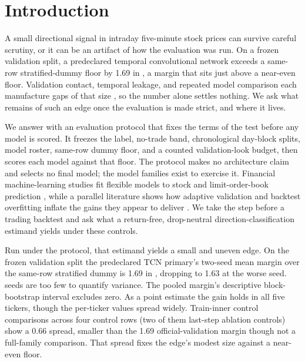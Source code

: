 \section{Introduction}

A small directional signal in intraday five-minute stock prices can survive careful
scrutiny, or it can be an artifact of how the evaluation was run. On a frozen
validation split, a predeclared temporal convolutional network exceeds a same-row
stratified-dummy floor by 1.69\pp{} in \macrofone{}, a margin that sits just above a
near-even floor. Validation contact, temporal leakage, and repeated model comparison
each manufacture gaps of that size
\cite{kapoor2023leakage,bailey2016probability,harvey2016cross}, so the number alone
settles nothing. We ask what remains of such an edge once the evaluation is made
strict, and where it lives.

We answer with an evaluation protocol that fixes the terms of the test before any
model is scored. It freezes the label, no-trade band, chronological day-block splits,
model roster, same-row dummy floor, and a counted validation-look budget, then scores
each model against that floor. The protocol makes no architecture claim and selects no
final model; the model families exist to exercise it. Financial machine-learning
studies fit flexible models to stock and limit-order-book prediction
\cite{gu2020empirical,zhang2019deeplob}, while a parallel literature shows how adaptive
validation and backtest overfitting inflate the gains they appear to deliver
\cite{kapoor2023leakage,bailey2016probability,harvey2016cross}. We take the step before
a trading backtest and ask what a return-free, drop-neutral direction-classification
estimand yields under these controls.

Run under the protocol, that estimand yields a small and uneven edge. On the frozen
validation split the predeclared TCN primary's two-seed mean margin over the same-row
stratified dummy is 1.69\pp{} in \macrofone{}, dropping to 1.63\pp{} at the worse seed.
\numseeds{} seeds are too few to quantify variance. The pooled margin's descriptive
block-bootstrap interval excludes zero. As a point estimate the gain holds in all five
tickers, though the per-ticker values spread widely. Train-inner control comparisons across four control rows (two of them
last-step ablation controls) show a 0.66\pp{} spread, smaller than the 1.69\pp{}
official-validation margin though not a full-family comparison. That spread fixes the
edge's modest size against a near-even floor.

